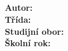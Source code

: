 \begin{titlepage}
    \begin{center}
        \docSchool \\
        \docSchoolAddress \\
        \vfill
        {\Huge \textbf{\docTitle}} \\
        \vspace{0.5cm}
        {\Large \docSubTitle} \\
        \vfill
        \begin{flushleft}
            \textbf{Autor:} \docAuthor \\
            \textbf{Třída:} \docClass \\
            \textbf{Studijní obor:} \docField \\
            \textbf{Školní rok:} \docYear \\
        \end{flushleft}
    \end{center}
\end{titlepage}